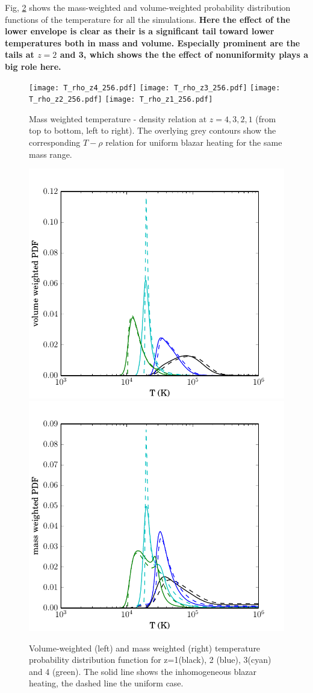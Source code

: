 \documentclass[twocolumns]{emulateapj}
\newcommand\Pc[1]{{\color{cyan} \bf #1}} %
\begin{document}
{Fig, \ref{fig:PDF} shows the mass-weighted and volume-weighted probability distribution functions of the temperature for all the simulations. \Pc{Here the effect of the lower envelope is clear as their is a significant tail toward lower temperatures both in mass and volume.  Especially prominent are the tails at $z = 2$ and 3, which shows the the effect of nonuniformity plays a big role here.} 


\begin{figure}
  \centering
  \texttt{[image: T\_rho\_z4\_256.pdf]}
  \texttt{[image: T\_rho\_z3\_256.pdf]}
  \texttt{[image: T\_rho\_z2\_256.pdf]}
  \texttt{[image: T\_rho\_z1\_256.pdf]}
  \caption{Mass weighted temperature - density relation  at  $z=4,3,2,1$ (from top to bottom, left to right). The overlying grey contours show the corresponding $T-\rho$ relation for uniform blazar heating \citep{2012MNRAS.423..149P} for the same mass range. }
  \label{fig:T_rho}
\end{figure}


\begin{figure}[h]
  \centering
  \includegraphics[width = .42\textwidth ]{full_PDF_256.pdf}
  \includegraphics[width = .42\textwidth ]{mass_weighted_PDF_256.pdf}
  \caption{Volume-weighted (left) and mass weighted (right)  temperature probability distribution function for z=1(black), 2 (blue), 3(cyan) and 4 (green). The solid line shows the inhomogeneous blazar heating, the dashed line the uniform case. }
  \label{fig:PDF}
\end{figure}


}
\end{document}
